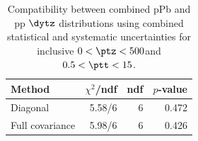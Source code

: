 \begin{table}[htp!]
\centering
\begin{tabular}{|l|r|r|r|}
\hline
Method & $\chi^2$/ndf & ndf & $p$-value \\
\hline
Diagonal & 5.58/6 & 6 & 0.472 \\
Full covariance & 5.98/6 & 6 & 0.426 \\
\hline
\end{tabular}
\caption{Compatibility between combined pPb and pp $\dytz$ distributions using combined statistical and systematic uncertainties for inclusive $0 < \ptz < 500$\GeV and $0.5 < \ptt < 15$\GeV.}
\label{table:chisq_deta}
\end{table}
